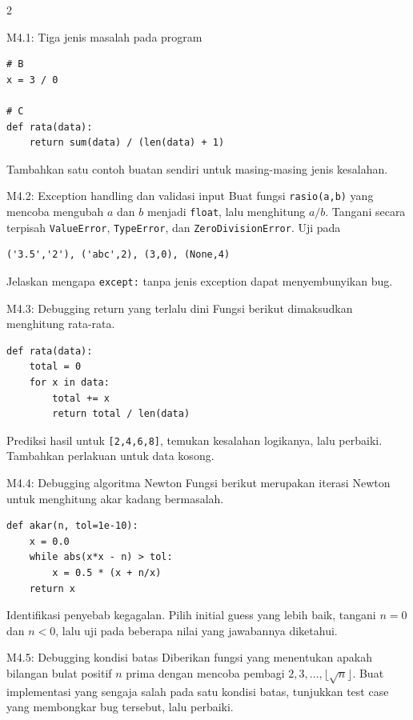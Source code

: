 \documentclass[9pt,a4paper]{article}
\begin{document}
\begin{multicols}{2}
\begin{qbox}[L1]{M4.1: Tiga jenis masalah pada program}
\begin{lstlisting}
# B
x = 3 / 0

# C
def rata(data):
    return sum(data) / (len(data) + 1)
\end{lstlisting}
Tambahkan satu contoh buatan sendiri untuk masing-masing jenis kesalahan.
\end{qbox}

\begin{qbox}[L2]{M4.2: Exception handling dan validasi input}
Buat fungsi \texttt{rasio(a,b)} yang mencoba mengubah $a$ dan $b$ menjadi \texttt{float}, lalu menghitung $a/b$. Tangani secara terpisah \texttt{ValueError}, \texttt{TypeError}, dan \texttt{ZeroDivisionError}. Uji pada
\begin{lstlisting}
('3.5','2'), ('abc',2), (3,0), (None,4)
\end{lstlisting}
Jelaskan mengapa \texttt{except:} tanpa jenis exception dapat menyembunyikan bug.
\end{qbox}

\begin{qbox}[L2]{M4.3: Debugging return yang terlalu dini}
Fungsi berikut dimaksudkan menghitung rata-rata.
\begin{lstlisting}
def rata(data):
    total = 0
    for x in data:
        total += x
        return total / len(data)
\end{lstlisting}
Prediksi hasil untuk \texttt{[2,4,6,8]}, temukan kesalahan logikanya, lalu perbaiki. Tambahkan perlakuan untuk data kosong.
\end{qbox}

\begin{qbox}[L3]{M4.4: Debugging algoritma Newton}
Fungsi berikut merupakan iterasi Newton untuk menghitung akar kadang bermasalah.
\begin{lstlisting}
def akar(n, tol=1e-10):
    x = 0.0
    while abs(x*x - n) > tol:
        x = 0.5 * (x + n/x)
    return x
\end{lstlisting}
Identifikasi penyebab kegagalan. Pilih initial guess yang lebih baik, tangani $n=0$ dan $n<0$, lalu uji pada beberapa nilai yang jawabannya diketahui.
\end{qbox}

\begin{qbox}[L3]{M4.5: Debugging kondisi batas}
Diberikan fungsi yang menentukan apakah bilangan bulat positif $n$ prima dengan mencoba pembagi $2,3,\ldots,\lfloor\sqrt n\rfloor$. Buat implementasi yang sengaja salah pada satu kondisi batas, tunjukkan test case yang membongkar bug tersebut, lalu perbaiki.
\end{qbox}


\end{multicols}
\end{document}
